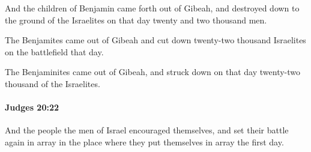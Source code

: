 			\begin{versebox}
					\item[BHS] 
					\item[ASV] And the children of Benjamin came forth out of Gibeah, and destroyed down to the ground of the Israelites on that day twenty and two thousand men.
					\item[NIV] The Benjamites came out of Gibeah and cut down twenty-two thousand Israelites on the battlefield that day.
					\item[NRSV] The Benjaminites came out of Gibeah, and struck down on that day twenty-two thousand of the Israelites.
			\end{versebox}

		\paragraph{Judges 20:22} %
			\label{JUDGES-20-22}

			And the people the men of Israel encouraged themselves, and set their battle again in array in the place where they put themselves in array the first day.

